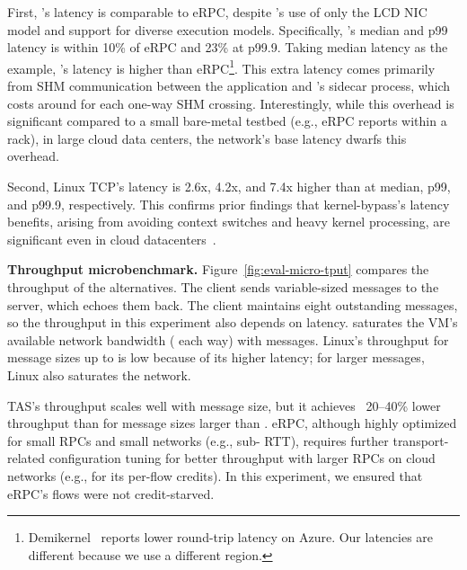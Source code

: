 First, \mt{}'s latency is comparable to eRPC, despite \mt{}'s use of only the LCD NIC model and support for diverse execution models.
Specifically, \mt{}'s median and p99 latency is within 10\% of eRPC and 23\% at p99.9.
Taking median latency as the example, \mt{}'s  latency is  higher than eRPC\footnote{Demikernel~\cite{demi-kernel} reports  lower round-trip latency on Azure. Our latencies are different because we use a different region.}.
This extra latency comes primarily from SHM communication between the application and \mt{}'s sidecar process, which costs around  for each one-way SHM crossing.
Interestingly, while this overhead is significant compared to a small bare-metal testbed (e.g., eRPC reports  within a rack), in large cloud data centers, the network's base latency dwarfs this overhead.

Second, Linux TCP's latency is 2.6x, 4.2x, and 7.4x higher than \mt{} at median, p99, and p99.9, respectively.
This confirms prior findings that kernel-bypass's latency benefits, arising from avoiding context switches and heavy kernel processing, are significant even in cloud datacenters~\cite{demi-kernel,Chardonnay2023OSDI}.



\textbf{Throughput microbenchmark.} Figure~\ref{fig:eval-micro-tput} compares the throughput of the alternatives.
The client sends variable-sized messages to the server, which echoes them back.
The client maintains eight outstanding messages, so the throughput in this experiment also depends on latency.
\mt{} saturates the VM's available network bandwidth ( each way) with  messages.
Linux's throughput for message sizes up to  is low because of its higher latency; for larger  messages, Linux also saturates the network.

TAS's throughput scales well with message size, but it achieves ~20--40\% lower throughput than \mt{} for message sizes larger than .
eRPC, although highly optimized for small RPCs and small networks (e.g., sub- RTT), requires further transport-related configuration tuning for better throughput with larger RPCs on cloud networks (e.g., for its per-flow credits).
In this experiment, we ensured that eRPC's flows were not credit-starved.

